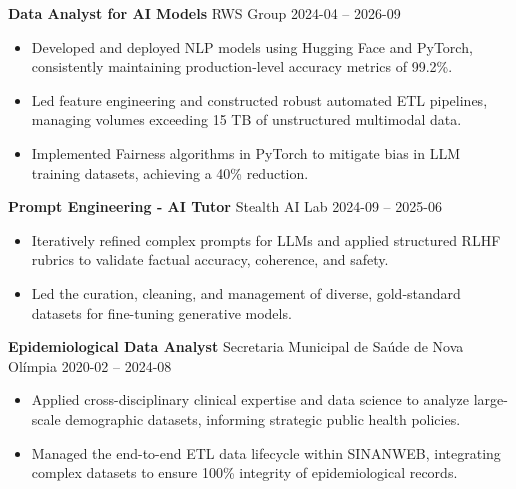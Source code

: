 ﻿\documentclass[11pt,a4paper]{article}
\begin{document}
\noindent \textbf{Data Analyst for AI Models} \textbar{} RWS Group \hfill 2024-04 -- 2026-09 \par
\begin{itemize}[noitemsep,topsep=2pt,parsep=2pt,partopsep=0pt, leftmargin=*]
    \item Developed and deployed NLP models using Hugging Face and PyTorch, consistently maintaining production-level accuracy metrics of 99.2\%.
    \item Led feature engineering and constructed robust automated ETL pipelines, managing volumes exceeding 15 TB of unstructured multimodal data.
    \item Implemented Fairness algorithms in PyTorch to mitigate bias in LLM training datasets, achieving a 40\% reduction.
\end{itemize}
\vspace{6pt}

\noindent \textbf{Prompt Engineering - AI Tutor} \textbar{} Stealth AI Lab \hfill 2024-09 -- 2025-06 \par
\begin{itemize}[noitemsep,topsep=2pt,parsep=2pt,partopsep=0pt, leftmargin=*]
    \item Iteratively refined complex prompts for LLMs and applied structured RLHF rubrics to validate factual accuracy, coherence, and safety.
    \item Led the curation, cleaning, and management of diverse, gold-standard datasets for fine-tuning generative models.
\end{itemize}
\vspace{6pt}

\noindent \textbf{Epidemiological Data Analyst} \textbar{} Secretaria Municipal de Saúde de Nova Olímpia \hfill 2020-02 -- 2024-08 \par
\begin{itemize}[noitemsep,topsep=2pt,parsep=2pt,partopsep=0pt, leftmargin=*]
    \item Applied cross-disciplinary clinical expertise and data science to analyze large-scale demographic datasets, informing strategic public health policies.
    \item Managed the end-to-end ETL data lifecycle within SINANWEB, integrating complex datasets to ensure 100\% integrity of epidemiological records.
\end{itemize}
\vspace{6pt}
\end{document}

